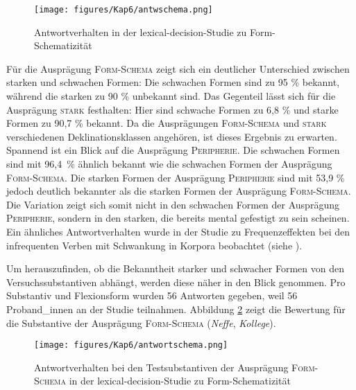 \begin{figure}
\texttt{[image: figures/Kap6/antwschema.png]} 
\caption{Antwortverhalten in der lexical-decision-Studie zu Form-Schematizität}
\label{schemaantalle}
\end{figure}

Für die Ausprägung \textsc{Form-Schema} zeigt sich ein deutlicher Unterschied zwischen starken und schwachen Formen: Die schwachen Formen sind zu 95 \% bekannt, während die starken zu 90 \% unbekannt sind. Das Gegenteil lässt sich für die Ausprägung \textsc{stark} festhalten: Hier sind schwache Formen zu 6,8 \% und starke Formen zu 90,7 \% bekannt. Da die Ausprägungen \textsc{Form-Schema} und \textsc{stark} verschiedenen Deklinationsklassen angehören, ist dieses Ergebnis zu erwarten. Spannend ist ein Blick auf die Ausprägung \textsc{Peripherie}. Die schwachen Formen sind mit 96,4~\% ähnlich bekannt wie die schwachen Formen der Ausprägung \textsc{Form-Schema}. Die starken Formen der Ausprägung \textsc{Peripherie} sind mit 53,9 \%  jedoch deutlich bekannter als die starken Formen der Ausprägung \textsc{Form-Schema}. Die Variation zeigt sich somit nicht in den schwachen Formen der Ausprägung \textsc{Peripherie}, sondern in den starken, die bereits mental gefestigt zu sein scheinen. Ein ähnliches Antwortverhalten wurde in der Studie zu Frequenzeffekten bei den infrequenten Verben mit Schwankung in Korpora beobachtet (siehe ).  

Um herauszufinden, ob die Bekanntheit starker und schwacher Formen von den Versuchssubstantiven abhängt, werden diese näher in den Blick genommen. Pro Substantiv und Flexionsform wurden 56 Antworten gegeben, weil 56 Pro\-\mbox{band\_in}\-nen an der Studie teilnahmen. Abbildung \ref{schemaantschema} zeigt die Bewertung für die Substantive der Ausprägung \textsc{Form-Schema} (\textit{Neffe}, \textit{Kollege}).

\begin{figure}
\texttt{[image: figures/Kap6/antwortschema.png]} 
\caption{Antwortverhalten bei den Testsubstantiven der Ausprägung \textsc{Form-Schema} in der lexical-decision-Studie zu Form-Schematizität}
\label{schemaantschema}
\end{figure}

